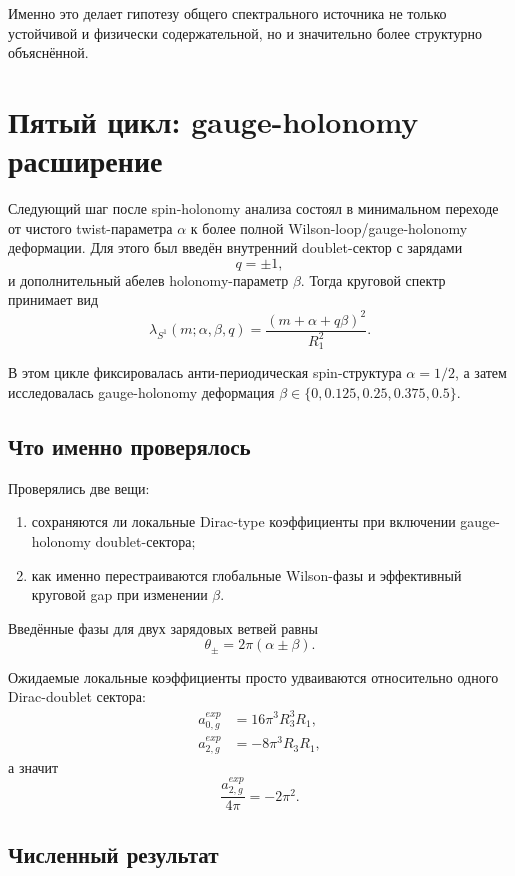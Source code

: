 \documentclass[12pt,a4paper]{article}
\begin{document}
Именно это делает гипотезу общего спектрального источника не только устойчивой и физически содержательной, но и значительно более структурно объяснённой.




\section{Пятый цикл: gauge-holonomy расширение}

Следующий шаг после spin-holonomy анализа состоял в минимальном переходе от чистого twist-параметра \(\alpha\) к более полной Wilson-loop/gauge-holonomy деформации. Для этого был введён внутренний doublet-сектор с зарядами
\[
q=\pm 1,
\]
и дополнительный абелев holonomy-параметр \(\beta\). Тогда круговой спектр принимает вид
\[
\lambda_{S^1}(m;\alpha,\beta,q)=\frac{(m+\alpha+q\beta)^2}{R_1^2}.
\]

В этом цикле фиксировалась анти-периодическая spin-структура \(\alpha=1/2\), а затем исследовалась gauge-holonomy деформация \(\beta\in\{0,0.125,0.25,0.375,0.5\}\).

\subsection{Что именно проверялось}

Проверялись две вещи:
\begin{enumerate}
    \item сохраняются ли локальные Dirac-type коэффициенты при включении gauge-holonomy doublet-сектора;
    \item как именно перестраиваются глобальные Wilson-фазы и эффективный круговой gap при изменении \(\beta\).
\end{enumerate}

Введённые фазы для двух зарядовых ветвей равны
\[
\theta_\pm = 2\pi(\alpha\pm\beta).
\]

Ожидаемые локальные коэффициенты просто удваиваются относительно одного Dirac-doublet сектора:
\begin{align}
 a_{0,g}^{exp} &= 16\pi^3 R_3^3R_1,\\
 a_{2,g}^{exp} &= -8\pi^3 R_3R_1,
\end{align}
а значит
\[
\frac{a_{2,g}^{exp}}{4\pi}=-2\pi^2.
\]

\subsection{Численный результат}
\end{document}
